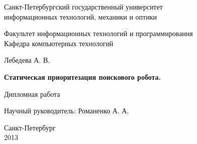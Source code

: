 \documentclass{report}
\theoremstyle{plain}
\theoremstyle{definition}
\numberwithin{theorem}{chapter}        %
\begin{document}


\initializefrontsections

\pagestyle{title}

\begin{center}
Санкт-Петербургский государственный университет \\ информационных технологий, механики и оптики

\vspace{2cm}

Факультет информационных технологий и программирования \\
Кафедра компьютерных технологий

\vspace{3cm}

{\Large Лебедева А. В.}

\vspace{2cm}

\vbox{\LARGE\bfseries
Статическая приоритезация поискового робота.
}

\vspace{4cm}

Дипломная работа 

\vspace{1cm}

{\Large Научный руководитель: Романенко А. А.}

\vspace{6cm}

Санкт-Петербург\\ 2013
\end{center}

\newpage

\setcounter{page}{3}
\pagestyle{plain}



\tableofcontents


\def\t#1{\mbox{\texttt{\hbox{#1}}}}
\def\b#1{\textbf{#1}}
\def\tb#1{\t{\b{#1}}}

\def\cln#1{\t{#1}}
\def\pcn#1{\t{#1}}
\newcommand{\p}{\par Здесь будет текст...}
\end{document}
